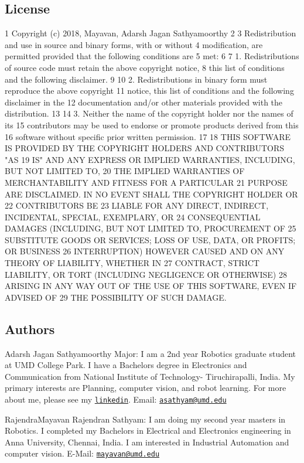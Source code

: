 \subsection*{License}


\begin{DoxyCode}
1 Copyright (c) 2018, Mayavan,  Adarsh Jagan Sathyamoorthy 
2 
3 Redistribution and use in source and binary forms, with or without  
4 modification, are permitted provided that the following conditions are 
5 met:
6 
7 1. Redistributions of source code must retain the above copyright notice, 
8 this list of conditions and the following disclaimer.
9 
10 2. Redistributions in binary form must reproduce the above copyright 
11 notice, this list of conditions and the following disclaimer in the   
12 documentation and/or other materials provided with the distribution.
13 
14 3. Neither the name of the copyright holder nor the names of its 
15 contributors may be used to endorse or promote products derived from this 
16 software without specific prior written permission.
17 
18 THIS SOFTWARE IS PROVIDED BY THE COPYRIGHT HOLDERS AND CONTRIBUTORS "AS 
19 IS" AND ANY EXPRESS OR IMPLIED WARRANTIES, INCLUDING, BUT NOT LIMITED TO, 
20 THE IMPLIED WARRANTIES OF MERCHANTABILITY AND FITNESS FOR A PARTICULAR 
21 PURPOSE ARE DISCLAIMED. IN NO EVENT SHALL THE COPYRIGHT HOLDER OR 
22 CONTRIBUTORS BE 
23 LIABLE FOR ANY DIRECT, INDIRECT, INCIDENTAL, SPECIAL, EXEMPLARY, OR 
24 CONSEQUENTIAL DAMAGES (INCLUDING, BUT NOT LIMITED TO, PROCUREMENT OF 
25 SUBSTITUTE GOODS OR SERVICES; LOSS OF USE, DATA, OR PROFITS; OR BUSINESS 
26 INTERRUPTION) HOWEVER CAUSED AND ON ANY THEORY OF LIABILITY, WHETHER IN 
27 CONTRACT, STRICT LIABILITY, OR TORT (INCLUDING NEGLIGENCE OR OTHERWISE) 
28 ARISING IN ANY WAY OUT OF THE USE OF THIS SOFTWARE, EVEN IF ADVISED OF 
29 THE POSSIBILITY OF SUCH DAMAGE.
\end{DoxyCode}


\subsection*{Authors}


\begin{DoxyItemize}
\item Adarsh Jagan Sathyamoorthy Major\+: I am a 2nd year Robotics graduate student at U\+MD College Park. I have a Bachelors degree in Electronics and Communication from National Institute of Technology-\/ Tiruchirapalli, India. My primary interests are Planning, computer vision, and robot learning. For more about me, please see my \href{https://www.linkedin.com/in/adarsh-jagan-sathyamoorthy-6b6726b3/}{\tt linkedin}. Email\+: \href{mailto:asathyam@umd.edu}{\tt asathyam@umd.\+edu}
\item Rajendra\+Mayavan Rajendran Sathyam\+: I am doing my second year master\textquotesingle{}s in Robotics. I completed my Bachelors in Electrical and Electronics engineering in Anna University, Chennai, India. I am interested in Industrial Automation and computer vision. E-\/\+Mail\+: \href{mailto:mayavan@umd.edu}{\tt mayavan@umd.\+edu} 
\end{DoxyItemize}